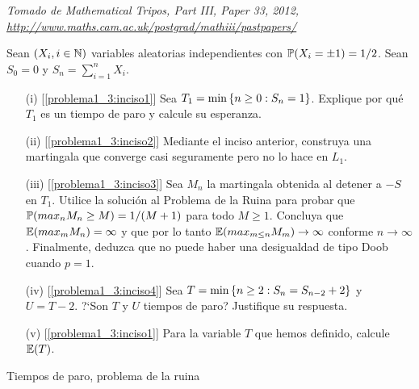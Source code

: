 \begin{problema}
	\emph{Tomado de Mathematical Tripos, Part III, Paper 33, 2012, \url{http://www.maths.cam.ac.uk/postgrad/mathiii/pastpapers/}}

	Sean $\left( X_i,i\in\mathbb{N}\right) $ variables aleatorias 
	independientes con $\mathbb{P}\! \left( X_i=\pm 1 \right)=1/2$. Sean $S_0=0$ y $S_n=\sum_{i=1}^n X_i$. 

	\begin{enumerate}
		\item[(i)]		[\ref{problema1_3:inciso1}]
		 Sea $T_1=\min\left\{ n\geq 0:S_n=1\right\} $. Explique por qu\'e $T_1$ es un 
		tiempo de paro y calcule su esperanza.
		
		\item[(ii)]		[\ref{problema1_3:inciso2}] 
		Mediante el inciso anterior, construya una martingala que converge 
		casi seguramente pero no lo hace en $L_1$.
		
		\item[(iii)]	[\ref{problema1_3:inciso3}] 
		Sea $M_n$ la martingala obtenida al detener a $-S$ en $T_1$. Utilice la solución al
		Problema de la Ruina para probar que \\
		$\mathbb{P}(max_n M_n \geq M) = 1/(M+1)$ para todo $M \geq 1$. Concluya que
		$\mathbb{E}(max_m M_n) = \infty$ y que por lo tanto $\mathbb{E}(max_{m\leq n} M_m) \rightarrow \infty$ conforme 
		$n \rightarrow \infty$. Finalmente, deduzca que no puede haber una desigualdad de tipo Doob cuando $p=1$.
		
		\item[(iv)] 	[\ref{problema1_3:inciso4}]
		Sea $T=\min\left\{ n\geq 2:S_n=S_{n-2} + 2\right\} $ y $U=T-2$. ?`Son $T$ y $U$ 
		tiempos de paro? Justifique su respuesta.
		
		\item[(v)]		[\ref{problema1_3:inciso1}]
		Para la variable $T$ que hemos definido, calcule $\mathbb{E}\! \left( T \right)$. 
	\end{enumerate}

	 Tiempos de paro, problema de la ruina
\end{problema}
